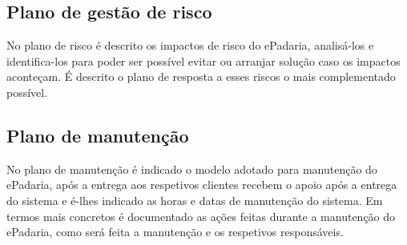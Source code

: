 \subsection{Plano de gestão de risco}
No plano de risco é descrito os impactos de risco do ePadaria, analisá-los e identifica-los para poder ser possível evitar ou arranjar solução caso os impactos aconteçam. É descrito o plano de resposta a esses riscos o mais complementado possível.
\subsection{Plano de manutenção}
No plano de manutenção é indicado o modelo adotado para manutenção do ePadaria, após a entrega aos respetivos clientes recebem o apoio após a entrega do sistema e é-lhes indicado as horas e datas de manutenção do sistema. Em termos mais concretos é documentado as ações feitas durante a manutenção do ePadaria, como será feita a manutenção e os respetivos responsáveis.